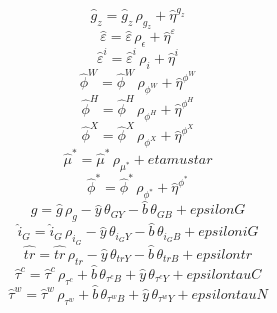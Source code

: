 \begin{dmath}
{{\hat{g}_z}}={{\hat{g}_z}}\, {\rho_{g_z}}+{\hat{\eta}^{g_z}}
\end{dmath}
\begin{dmath}
{\hat{\varepsilon}}={\hat{\varepsilon}}\, {\rho_{\epsilon}}+{\hat{\eta}^{\varepsilon}}
\end{dmath}
\begin{dmath}
{\hat{\varepsilon}^i}={\hat{\varepsilon}^i}\, {\rho_{i}}+{\hat{\eta}^{i}}
\end{dmath}
\begin{dmath}
{\hat{\phi}^W}={\hat{\phi}^W}\, {\rho_{\phi^W}}+{\hat{\eta}^{\phi^W}}
\end{dmath}
\begin{dmath}
{\hat{\phi}^H}={\hat{\phi}^H}\, {\rho_{\phi^H}}+{\hat{\eta}^{\phi^H}}
\end{dmath}
\begin{dmath}
{\hat{\phi}^X}={\hat{\phi}^X}\, {\rho_{\phi^X}}+{\hat{\eta}^{\phi^X}}
\end{dmath}
\begin{dmath}
{\hat{\mu}^*}={\hat{\mu}^*}\, {\rho_{\mu^*}}+{etamustar}
\end{dmath}
\begin{dmath}
{\hat{\phi}^*}={\hat{\phi}^*}\, {\rho_{\phi^*}}+{\hat{\eta}^{\phi^*}}
\end{dmath}
\begin{dmath}
{\hat{g}}={\hat{g}}\, {\rho_{g}}-{\hat{y}}\, {\theta_{GY}}-{\hat{b}}\, {\theta_{GB}}+{epsilonG}
\end{dmath}
\begin{dmath}
{\hat{i}_G}={\hat{i}_G}\, {\rho_{i_G}}-{\hat{y}}\, {\theta_{i_GY}}-{\hat{b}}\, {\theta_{i_GB}}+{epsiloniG}
\end{dmath}
\begin{dmath}
{\hat{tr}}={\hat{tr}}\, {\rho_{tr}}-{\hat{y}}\, {\theta_{trY}}-{\hat{b}}\, {\theta_{trB}}+{epsilontr}
\end{dmath}
\begin{dmath}
{\hat{\tau}^c}={\hat{\tau}^c}\, {\rho_{\tau^c}}+{\hat{b}}\, {\theta_{\tau^cB}}+{\hat{y}}\, {\theta_{\tau^cY}}+{epsilontauC}
\end{dmath}
\begin{dmath}
{\hat{\tau}^w}={\hat{\tau}^w}\, {\rho_{\tau^w}}+{\hat{b}}\, {\theta_{\tau^wB}}+{\hat{y}}\, {\theta_{\tau^wY}}+{epsilontauN}
\end{dmath}
